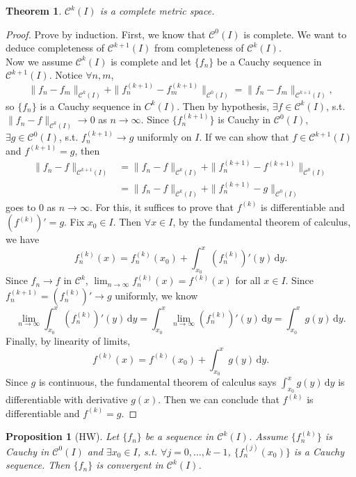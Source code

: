\documentclass[12pt]{article}
\theoremstyle{plain}
\newtheorem{thm}{Theorem}
\newtheorem*{prop}{Proposition}
\theoremstyle{definition}
\begin{document}
\begin{thm}
    $\mathcal{C}^k(I)$ is a complete metric space.
\end{thm}
\begin{proof}
    Prove by induction.
    First, we know that $\mathcal{C}^0(I)$ is complete.
    We want to deduce completeness of $\mathcal{C}^{k+1}(I)$ from completeness of
    $\mathcal{C}^k(I)$.\\
    Now we assume $\mathcal{C}^k(I)$ is complete and let $\{f_n\}$ be a Cauchy
    sequence in $\mathcal{C}^{k+1}(I)$.
    Notice $\forall n,m$,
    $$\|f_n-f_m\|_{\mathcal{C}^k(I)}+\|f_n^{(k+1)}-f_m^{(k+1)}\|_{\mathcal{C}^0(I)}=\|f_n-f_m\|_{\mathcal{C}^{k+1}(I)},$$
    so $\{f_n\}$ is a Cauchy sequence in $C^k(I)$.  
    Then by hypothesis, $\exists f\in \mathcal{C}^k(I)$, s.t. 
    $\|f_n-f\|_{\mathcal{C}^k(I)}\rightarrow 0$ as $n\rightarrow\infty$.
    Since $\{f_n^{(k+1)}\}$ is Cauchy in $\mathcal{C}^0(I)$, $\exists g\in \mathcal{C}^0(I)$, s.t.
    $f_n^{(k+1)}\rightarrow g$ uniformly on $I$.
    If we can show that $f\in \mathcal{C}^{k+1}(I)$ and $f^{(k+1)}=g$, then
    $$\begin{aligned}
    \|f_n-f\|_{\mathcal{C}^{k+1}(I)}
    &=\|f_n-f\|_{\mathcal{C}^k(I)}+\|f_n^{(k+1)}-f^{(k+1)}\|_{\mathcal{C}^0(I)}\\
    &=\|f_n-f\|_{\mathcal{C}^k(I)}+\|f_n^{(k+1)}-g\|_{\mathcal{C}^0(I)}
    \end{aligned}$$
    goes to 0 as $n\rightarrow\infty$.
    For this, it suffices to prove that $f^{(k)}$ is differentiable and
    $(f^{(k)})'=g$.
    Fix $x_0\in I$.
    Then $\forall x\in I$, by the fundamental theorem of calculus, we have
    $$f_n^{(k)}(x)=f_n^{(k)}(x_0)+\int_{x_0}^x(f_n^{(k)})'(y)\,\mathrm{d}y.$$
    Since $f_n\rightarrow f$ in $\mathcal{C}^k$,
    $\lim_{n\rightarrow\infty}f_n^{(k)}(x)=f^{(k)}(x)$ for all $x\in I$.
    Since $f_n^{(k+1)}=(f_n^{(k)})'\rightarrow g$ uniformly, we know
    $$\lim_{n\rightarrow\infty}\int_{x_0}^x(f_n^{(k)})'(y)\,\mathrm{d}y=\int_{x_0}^x\lim_{n\rightarrow\infty}(f_n^{(k)})'(y)\,\mathrm{d}y=\int_{x_0}^xg(y)\,\mathrm{d}y.$$
    Finally, by linearity of limits,
    $$f^{(k)}(x)=f^{(k)}(x_0)+\int_{x_0}^xg(y)\,\mathrm{d}y.$$
    Since $g$ is continuous, the fundamental theorem of calculus says
    $\int_{x_0}^xg(y)\,\mathrm{d}y$ is differentiable with derivative $g(x)$.
    Then we can conclude that $f^{(k)}$ is differentiable and $f^{(k)}=g$.
\end{proof}

\begin{prop}[HW]
    Let $\{f_n\}$ be a sequence in $\mathcal{C}^k(I)$.
    Assume $\{f_n^{(k)}\}$ is Cauchy in $\mathcal{C}^0(I)$ and $\exists x_0\in
    I$, s.t. $\forall j= 0,\ldots,k-1$, $\{f_n^{(j)}(x_0)\}$ is a Cauchy sequence.
    Then $\{f_n\}$ is convergent in $\mathcal{C}^k(I)$.
\end{prop}
\end{document}
